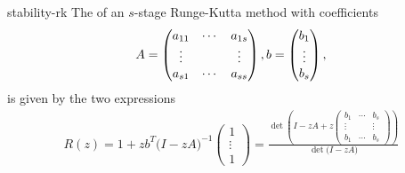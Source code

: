 \begin{Lemma}{stability-rk}
  The  of an $s$-stage Runge-Kutta method with
  coefficients
  \begin{gather*}
    A=
    \begin{pmatrix}
      a_{11} & \cdots & a_{1s}
      \\ \vdots & & \vdots \\
      a_{s1} & \cdots & a_{ss}
    \end{pmatrix},
    b =
    \begin{pmatrix}
      b_1 \\ \vdots \\ b_s
    \end{pmatrix},
  \end{gather*}
  is given by the two expressions
  \begin{gather}
    \label{eq:stability-rk:1}
    R(z) = 1+ z b^T \bigl(I-zA\bigr)^{-1}
    \begin{pmatrix}
      1\\\vdots\\1
    \end{pmatrix}
    = \frac{\operatorname{det}\left(I-zA+z
        \begin{pmatrix}
          b_1 & \cdots & b_s\\
          \vdots & & \vdots \\
          b_1 & \cdots & b_s
        \end{pmatrix}\right)
}{\operatorname{det}\bigl(I-zA\bigr)}
  \end{gather}
\end{Lemma}

